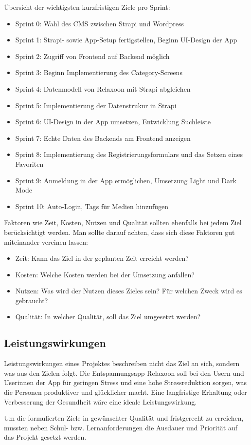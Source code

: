 Übersicht der wichtigsten kurzfristigen Ziele pro Sprint:
\begin{itemize}
      \item Sprint 0: Wahl des CMS zwischen Strapi und Wordpress
      \item Sprint 1: Strapi- sowie App-Setup fertigstellen, Beginn UI-Design der App
      \item Sprint 2: Zugriff von Frontend auf Backend möglich
      \item Sprint 3: Beginn Implementierung des Category-Screens
      \item Sprint 4: Datenmodell von Relaxoon mit Strapi abgleichen
      \item Sprint 5: Implementierung der Datenstrukur in Strapi
      \item Sprint 6: UI-Design in der App umsetzen, Entwicklung Suchleiste
      \item Sprint 7: Echte Daten des Backends am Frontend anzeigen
      \item Sprint 8: Implementierung des Registrierungsformulars und das Setzen eines Favoriten 
      \item Sprint 9: Anmeldung in der App ermöglichen, Umsetzung Light und Dark Mode
      \item Sprint 10: Auto-Login, Tags für Medien hinzufügen
\end{itemize}

Faktoren wie Zeit, Kosten, Nutzen und Qualität sollten ebenfalls bei jedem Ziel berücksichtigt werden. Man
sollte darauf achten, dass sich diese Faktoren gut miteinander vereinen lassen:
\begin{itemize}
      \item Zeit: Kann das Ziel in der geplanten Zeit erreicht werden?
      \item Kosten: Welche Kosten werden bei der Umsetzung anfallen?
      \item Nutzen: Was wird der Nutzen dieses Zieles sein? Für welchen Zweck wird es gebraucht?
      \item Qualität: In welcher Qualität, soll das Ziel umgesetzt werden?
\end{itemize}

\subsection{Leistungswirkungen}

Leistungswirkungen eines Projektes beschreiben nicht das Ziel an sich, sondern was aus den Zielen folgt.
Die Entspannungsapp Relaxoon soll bei den Usern und Userinnen der App für geringen Stress und eine hohe
Stressreduktion sorgen, was die Personen produktiver und glücklicher macht. Eine langfristige Erhaltung oder
Verbesserung der Gesundheit wäre eine ideale Leistungswirkung. 

Um die formulierten Ziele in gewünschter Qualität und fristgerecht zu erreichen, mussten
neben Schul- bzw. Lernanforderungen die Ausdauer und Priorität auf das Projekt
gesetzt werden.
